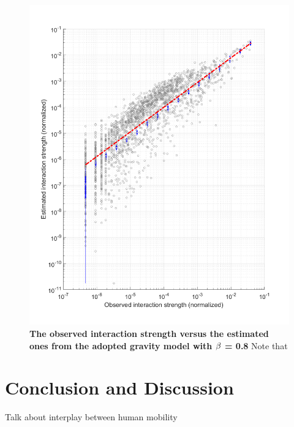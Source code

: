 \documentclass[]{tGIS2e}
\begin{document}
{\begin{figure}[ht]
\begin{center}
\includegraphics[width=0.8\linewidth]{./figure/Gravity}
\caption{{\bf The observed interaction strength versus the estimated ones from the adopted gravity model with $\bf{\beta}$ = 0.8 } Note that }
\label{S8_Fig}
\end{center}
\end{figure}

\clearpage
\section{Conclusion and Discussion}
Talk about interplay between human mobility 



}
\end{document}
